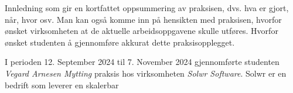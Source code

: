 \color{trolleygrey} 
Innledning som gir en kortfattet oppsummering av praksisen, dvs. hva er gjort, når, hvor osv. Man kan også komme inn på hensikten med praksisen, hvorfor ønsket virksomheten at de aktuelle arbeidsoppgavene
skulle utføres. Hvorfor ønsket studenten å gjennomføre akkurat dette praksisopplegget.
\color{black}

I perioden 12. September 2024 til 7. November 2024 gjennomførte studenten \textit{Vegard Arnesen Mytting} praksis hos virksomheten \textit{Solwr Software}. Solwr er en bedrift som leverer en skalerbar